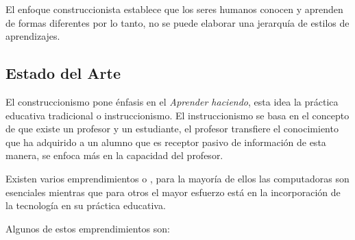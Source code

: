 El enfoque construccionista establece que los seres humanos conocen y aprenden
de formas diferentes por lo tanto, no se puede elaborar una jerarquía de estilos
de aprendizajes\cite{valdivia:sg}.

\subsection{Estado del Arte}

El construccionismo pone énfasis en el \emph{Aprender haciendo}, esta idea
 la práctica educativa tradicional o instruccionismo. El instruccionismo
se basa en el concepto de que existe un profesor y un estudiante, el profesor
transfiere el conocimiento que ha adquirido a un alumno que es receptor pasivo
de información de esta manera, se enfoca más en la capacidad del profesor. 

Existen varios emprendimientos o \emph{},
para la mayoría de ellos las computadoras son esenciales mientras que para otros
el mayor esfuerzo está en la incorporación de la tecnología en su práctica
educativa\cite{papertian:const}.

Algunos de estos emprendimientos son:

